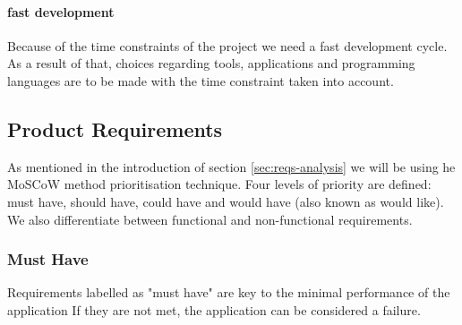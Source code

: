 \paragraph{fast development} Because of the time constraints of the project we need a fast development cycle. As a result of that, choices regarding tools, applications and programming languages are to be made with the time constraint taken into account.


\subsection{Product Requirements}\label{sec:reqs}
As mentioned in the introduction of section \ref{sec:reqs-analysis} we will be using he MoSCoW method prioritisation technique. Four levels of priority are defined: must have, should have, could have and would have (also known as would like). We also differentiate between functional and non-functional requirements. 

\subsubsection {Must Have}
Requirements labelled as "must have" are key to the minimal performance of the application If they are not met, the application can be considered a failure.


